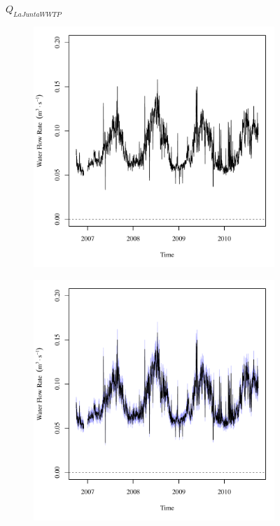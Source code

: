 \subfiguremid
\begin{landscape}
	\begin{figure}
		\centering
		$ Q_{LaJuntaWWTP} $
		\begin{subfigure}{0.7\textwidth}
			\centering
			\includegraphics[width=\tableCustomSize]{"Figures/Results_USR/Deterministic/Q WTP"}
		\end{subfigure}%
		\begin{subfigure}{0.7\textwidth}
			\centering
			\includegraphics[width=\tableCustomSize]{"Figures/Results_USR/Stochastic/Q WTP"}

\end{subfigure}
\end{figure}
\end{landscape}
